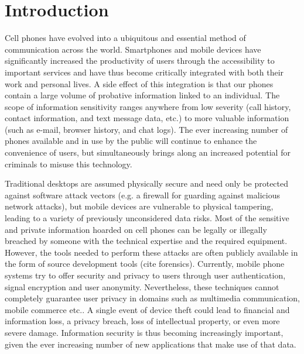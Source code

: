 \documentclass[conference,10pt]{IEEEtran}
\begin{document}




%
\IEEEpeerreviewmaketitle

\section{Introduction}
Cell phones have evolved into a ubiquitous and essential method of communication across the world.  
Smartphones and mobile devices have significantly increased the productivity of users through the 
accessibility to important services and have thus become critically integrated with both their work and 
personal lives.   A side effect of this integration is that our phones contain a large volume of 
probative information linked to an individual.  The scope of information sensitivity ranges 
anywhere from low severity (call history, contact information, and text message data, etc.) to more 
valuable information (such as e-mail, browser history, and chat logs). The ever increasing number of 
 phones available and in use by the public will continue to enhance the convenience of users, but 
simultaneously brings along an increased potential for criminals to misuse this technology.

Traditional desktops are assumed physically secure and need only be protected against software 
attack vectors (e.g. a firewall for guarding against malicious network attacks), but mobile devices 
are vulnerable to physical tampering, leading to a variety of previously unconsidered data risks.  
Most of the sensitive and private information hoarded on cell phones can be legally or illegally 
breached by someone with the technical expertise and the required equipment.  However, the tools 
needed to perform these attacks are often publicly available in the form of source development tools 
(cite forensics).  Currently, mobile phone systems try to offer security and privacy to users 
through user authentication, signal encryption and user anonymity. Nevertheless, these techniques 
cannot completely guarantee user privacy in domains such as multimedia communication, mobile 
commerce etc..  A single event of device theft could lead to financial and information loss, a 
privacy breach, loss of intellectual property, or even more severe damage. Information security is 
thus becoming increasingly important, given the ever increasing number of new applications that make 
use of that data.
\end{document}
